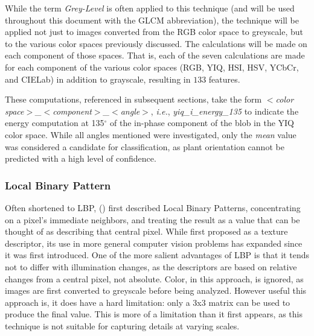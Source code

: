\documentclass[letterpaper, notitlepage]{report}
\begin{document}
While the term \textit{Grey-Level} is often applied to this technique (and will be used throughout this document with the GLCM abbreviation), the technique will be applied not just to images converted from the RGB color space to greyscale, but to the various color spaces previously discussed. The calculations will be made on each component of those spaces.  That is, each of the seven calculations are made for each component of the various color spaces (RGB, YIQ, HSI, HSV, YCbCr, and CIELab) in addition to grayscale, resulting in  $133$ features.

These computations, referenced in subsequent sections, take the form \textit{$<$color space$>$\_$<$component$>$\_$<$angle$>$}, \textit{i.e.}, \textit{yiq\_i\_energy\_135} to indicate the energy computation at 135$^{\circ}$ of the in-phase component of the blob in the YIQ color space.  While all angles mentioned were investigated, only the \textit{mean} value was considered a candidate for classification, as plant orientation cannot be predicted with a high level of confidence.


\subsubsection{Local Binary Pattern}
Often shortened to LBP, \citeauthor{Ojala1996-ps} (\citeyear{Ojala1996-ps}) first described Local Binary Patterns, concentrating on a pixel's immediate neighbors, and treating the result as a value that can be thought of as describing that central pixel. While first proposed as a texture descriptor, its use in more general computer vision problems has expanded since it was first introduced. One of the more salient advantages of LBP is that it tends not to differ with illumination changes, as the descriptors are based on relative changes from a central pixel, not absolute. Color, in this approach, is ignored, as images are first converted to greyscale before being analyzed. However useful this approach is, it does have a hard limitation: only a 3x3 matrix can be used to produce the final value. This is more of a limitation than it first appears, as this technique is not suitable for capturing details at varying scales.
\end{document}
